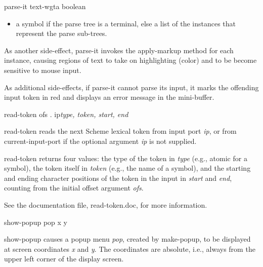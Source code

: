 \documentclass{article}
\begin{document}
\begin{proc}{parse-it}{ text-wgt}{a boolean}
\begin{itemize}
\item a symbol if the parse tree is a terminal, else a list of the 
 instances that represent the parse sub-trees.

\end{itemize}

As another side-effect, {\sf parse-it} invokes the {\sf apply-markup}
 method for each  instance, causing
regions of text to take on highlighting (color) and to be become
sensitive to mouse input.

As additional side-effects, if {\sf parse-it} cannot parse its input,
it marks the offending input token in red and displays an error
message in the mini-buffer.

\end{proc}



\begin{proc}{read-token}{ ofs . ip}{\sl type, token, start, end}

{\sf read-token} reads the next Scheme lexical token from input port
{\sl ip}, or from {\sf current-input-port} if the optional argument
{\sl ip} is not supplied.  

{\sf read-token} returns four values: the type of the token in {\sl
type} (e.g., {\sf atomic} for a symbol), the token itself in {\sl
token} (e.g., the name of a symbol), and the starting and ending
character positions of the token in the input in {\sl start} and {\sl
end}, counting from the initial offset argument {\sl ofs}.

See the documentation file, {\sf read-token.doc}, for more
information.

\end{proc}



\begin{proc}{show-popup}{ pop x y}{}

{\sf show-popup} causes a popup menu {\sl pop}, created by {\sf
make-popup}, to be displayed at screen coordinates {\sl x} and {\sl
y}.  The coordinates are absolute, i.e., always from the upper left
corner of the display screen.

\end{proc}
\end{document}
